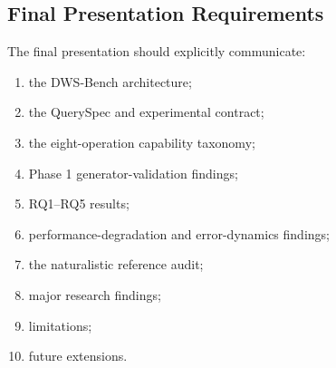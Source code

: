 \documentclass{iutbscthesis}
\begin{document}
\begin{appendices}
\section{Final Presentation Requirements}
The final presentation should explicitly communicate:
\begin{enumerate}
\item the DWS-Bench architecture;
\item the QuerySpec and experimental contract;
\item the eight-operation capability taxonomy;
\item Phase 1 generator-validation findings;
\item RQ1--RQ5 results;
\item performance-degradation and error-dynamics findings;
\item the naturalistic reference audit;
\item major research findings;
\item limitations;
\item future extensions.
\end{enumerate}
\end{appendices}
\end{document}
